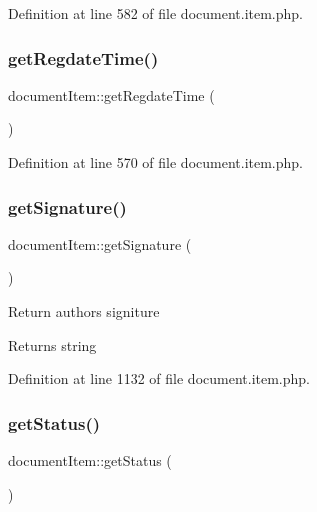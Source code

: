 Definition at line 582 of file document.\+item.\+php.

\mbox{\label{classdocumentItem_ac5d8db0250cc8f448d9a76aaa3afa953}} 
\subsubsection{\texorpdfstring{get\+Regdate\+Time()}{getRegdateTime()}}
{\footnotesize\ttfamily document\+Item\+::get\+Regdate\+Time (\begin{DoxyParamCaption}{ }\end{DoxyParamCaption})}



Definition at line 570 of file document.\+item.\+php.

\mbox{\label{classdocumentItem_a03b199ae0def81ea3a9067bbb0186f17}} 
\subsubsection{\texorpdfstring{get\+Signature()}{getSignature()}}
{\footnotesize\ttfamily document\+Item\+::get\+Signature (\begin{DoxyParamCaption}{ }\end{DoxyParamCaption})}

Return author\textquotesingle{}s signiture \begin{DoxyReturn}{Returns}
string 
\end{DoxyReturn}


Definition at line 1132 of file document.\+item.\+php.

\mbox{\label{classdocumentItem_aa750ee0716698bf29c9690382b7fa3ef}} 
\subsubsection{\texorpdfstring{get\+Status()}{getStatus()}}
{\footnotesize\ttfamily document\+Item\+::get\+Status (\begin{DoxyParamCaption}{ }\end{DoxyParamCaption})}



